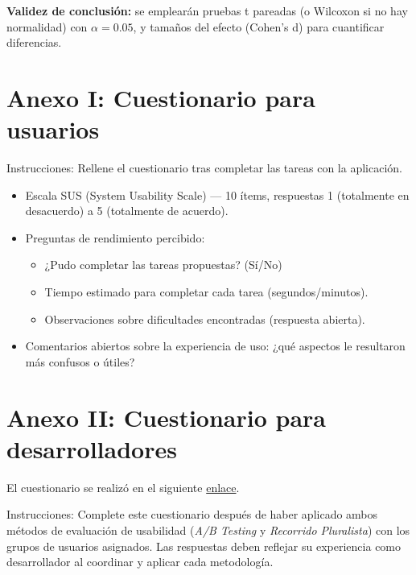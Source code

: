 \documentclass[a4paper,12pt]{report}
\begin{document}
\textbf{Validez de conclusión:} se emplearán pruebas t pareadas (o Wilcoxon si no hay normalidad) con $\alpha=0.05$, y tamaños del efecto (Cohen’s d) para cuantificar diferencias.


\cleardoublepage

\printbibliography[heading=bibintoc,title={Bibliografía}]
\appendix
\chapter{Anexo I: Cuestionario para usuarios}
\label{anexo:usuarios}

Instrucciones: Rellene el cuestionario tras completar las tareas con la aplicación.

\begin{itemize}
    \item Escala SUS (System Usability Scale) — 10 ítems, respuestas 1 (totalmente en desacuerdo) a 5 (totalmente de acuerdo).
    \item Preguntas de rendimiento percibido:
    \begin{itemize}
        \item ¿Pudo completar las tareas propuestas? (Sí/No)
        \item Tiempo estimado para completar cada tarea (segundos/minutos).
        \item Observaciones sobre dificultades encontradas (respuesta abierta).
    \end{itemize}
    \item Comentarios abiertos sobre la experiencia de uso: ¿qué aspectos le resultaron más confusos o útiles?
\end{itemize}

\chapter{Anexo II: Cuestionario para desarrolladores}
\label{anexo:desarrolladores}

El cuestionario se realizó en el siguiente \href{https://docs.google.com/forms/d/1ct0bRRyEHIIYPp2TrhZ53o755vneEbUIfic6f0XR7HM}{enlace}.


Instrucciones: Complete este cuestionario después de haber aplicado ambos métodos de evaluación de usabilidad (\textit{A/B Testing} y \textit{Recorrido Pluralista}) con los grupos de usuarios asignados. Las respuestas deben reflejar su experiencia como desarrollador al coordinar y aplicar cada metodología.
\end{document}
